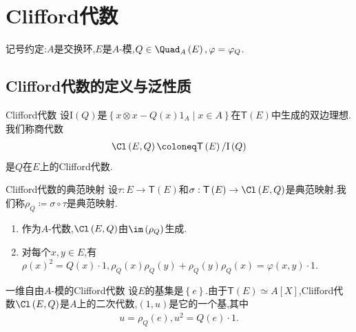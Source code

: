 \chapter{Clifford代数}

记号约定:$A$是交换环,$E$是$A$-模,$Q\in\Quad_{A}\left(E\right),\varphi=\varphi_{Q}$.

\section{Clifford代数的定义与泛性质}

\begin{definition}{Clifford代数}{}
	设$\mathrm{I}\left(Q\right)$是$\left\{x\otimes x-Q\left(x\right)1_{A}\middle|x\in A\right\}$在$\mathsf{T}\left(E\right)$中生成的双边理想.我们称商代数
	\begin{align*}
		\Cl\left(E,Q\right)\coloneq\mathsf{T}\left(E\right)/\mathrm{I}\left(Q\right)
	\end{align*}
	是$Q$在$E$上的Clifford代数.
\end{definition}

\begin{definition}{Clifford代数的典范映射}{}
	设$\tau:E\to\mathsf{T}\left(E\right)$和$\sigma:\mathsf{T}\left(E\right)\to\Cl\left(E,Q\right)$是典范映射.我们称$\rho_{Q}\coloneq\sigma\circ\tau$是典范映射.
\end{definition}

\begin{remark}{}{}
	\begin{enumerate}
		\item 作为$A$-代数,$\Cl\left(E,Q\right)$由$\im\left(\rho_{Q}\right)$生成.
		\item 对每个$x,y\in E$,有$\rho\left(x\right)^{2}=Q\left(x\right)\cdot 1,\rho_{Q}\left(x\right)\rho_{Q}\left(y\right)+\rho_{Q}\left(y\right)\rho_{Q}\left(x\right)=\varphi\left(x,y\right)\cdot 1$.
	\end{enumerate}
\end{remark}

\begin{example}{一维自由$A$-模的Clifford代数}{}
	设$E$的基集是$\left\{e\right\}$.由于$\mathsf{T}\left(E\right)\simeq A[X]$,Clifford代数$\Cl\left(E,Q\right)$是$A$上的二次代数,$\left(1,u\right)$是它的一个基,其中
	\begin{align*}
		u=\rho_{Q}\left(e\right),u^{2}=Q\left(e\right)\cdot 1.
	\end{align*}
\end{example}

